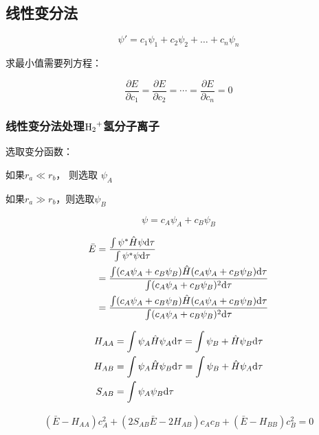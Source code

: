 \subsection{线性变分法}

\begin{equation*}
    \psi ' = c_1 \psi_1 + c_2 \psi_2 + \dots + c_n \psi_n
\end{equation*}


求最小值需要列方程：


\begin{equation*}
    \frac{\partial E}{\partial c_1} = \frac{\partial E}{\partial c_2} = \cdots = \frac{\partial E}{\partial c_n} = 0
\end{equation*}



\subsubsection{线性变分法处理$\ce{H2+}$氢分子离子}

选取变分函数：


如果$r_a \ll r_b$， 则选取 $\psi_A$ 

如果$r_a \gg r_b$，则选取$\psi_B$

\begin{equation*}
    \psi = c_A \psi_A + c_B \psi_B
\end{equation*}

\begin{align*}
    \bar{E} &= \frac{\int \psi^* \hat{H} \psi \mathrm{d} \tau}{\int \psi^*  \psi \mathrm{d} \tau}  \\
    &= \frac{\int (c_A\psi_A + c_B\psi_B) \hat{H} ( c_A\psi_A + c_B\psi_B) \mathrm{d} \tau}{\int (c_A\psi_A + c_B\psi_B)^2 \mathrm{d} \tau} \\ 
    &= \frac{\int (c_A\psi_A + c_B\psi_B) \hat{H} ( c_A\psi_A + c_B\psi_B) \mathrm{d} \tau}{\int (c_A\psi_A + c_B\psi_B)^2 \mathrm{d} \tau} \\ 
\end{align*}


\begin{align*}
    H_{AA} &= \int \psi_A \hat{H} \psi_A \mathrm{d} \tau = \int \psi_B + \hat{H} \psi_B \mathrm{d} \tau \\ 
    H_{AB} &= \int \psi_A \hat{H} \psi_B \mathrm{d} \tau = \int \psi_B + \hat{H} \psi_A \mathrm{d} \tau \\ 
    S_{AB} &= \int \psi_A \psi_B \mathrm{d} \tau
\end{align*}



\begin{align*}
    \left( \bar{E} - H_{AA} \right) c_A^2 + \left( 2S_{AB} \bar{E} - 2H_{AB}   \right)c_Ac_B + \left(  \bar{E} - H_{BB} \right)c_B^2 = 0
\end{align*}


